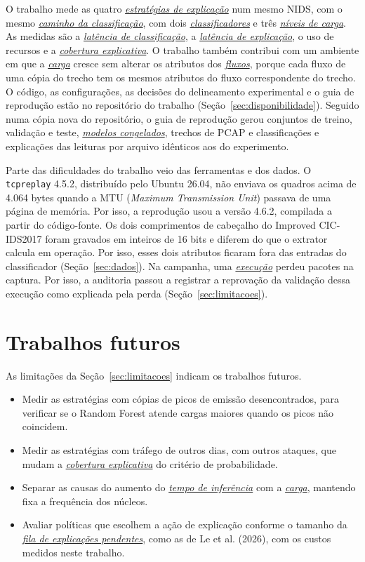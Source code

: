 \documentclass[
  12pt,
  oneside,
  a4paper,
  chapter=TITLE,
  sumario=tradicional,
  english,
  brazil
]{abntex2}
\newcommand{\termo}[2]{\hyperref[gl:#1]{\emph{#2}}}
\begin{document}
O trabalho mede as quatro \termo{estrategia}{estratégias de explicação} num mesmo NIDS, com o mesmo
\termo{caminho}{caminho da classificação}, com dois \termo{classificador}{classificadores} e três
\termo{nivel-carga}{níveis de carga}. As medidas são a
\termo{latencia-classificacao}{latência de classificação}, a
\termo{latencia-explicacao}{latência de explicação}, o uso de recursos e a
\termo{cobertura-explicativa}{cobertura explicativa}. O trabalho também contribui com um ambiente em
que a \termo{carga}{carga} cresce sem alterar os atributos dos \termo{fluxo}{fluxos}, porque cada
fluxo de uma cópia do trecho tem os mesmos atributos do fluxo correspondente do trecho. O código, as
configurações, as decisões do delineamento experimental e o guia de reprodução estão no repositório
do trabalho (Seção~\ref{sec:disponibilidade}).
Seguido numa cópia nova do repositório, o guia de reprodução gerou conjuntos de treino, validação e
teste, \termo{modelo-congelado}{modelos congelados}, trechos de PCAP e classificações e explicações
das leituras por arquivo idênticos aos do experimento.

Parte das dificuldades do trabalho veio das ferramentas e dos dados. O \texttt{tcpreplay} 4.5.2,
distribuído pelo Ubuntu 26.04, não enviava os quadros acima de 4.064 bytes quando a MTU (\emph{Maximum Transmission
Unit}) passava de uma página de memória. Por isso, a reprodução usou a versão 4.6.2, compilada a partir do
código-fonte. Os dois comprimentos de cabeçalho do Improved CIC-IDS2017 foram gravados em inteiros
de 16 bits e diferem do que o extrator calcula em operação. Por isso, esses dois atributos ficaram
fora das entradas do classificador (Seção~\ref{sec:dados}). Na campanha, uma
\termo{execucao}{execução} perdeu pacotes na captura. Por isso, a auditoria passou a registrar a
reprovação da validação dessa execução como explicada pela perda (Seção~\ref{sec:limitacoes}).

\section{Trabalhos futuros}

As limitações da Seção~\ref{sec:limitacoes} indicam os trabalhos futuros.
\begin{itemize}
  \item Medir as estratégias com cópias de picos de emissão desencontrados, para verificar se o
  Random Forest atende cargas maiores quando os picos não coincidem.
  \item Medir as estratégias com tráfego de outros dias, com outros ataques, que mudam a
  \termo{cobertura-explicativa}{cobertura explicativa} do critério de probabilidade.
  \item Separar as causas do aumento do \termo{tempo-inferencia}{tempo de inferência} com a
  \termo{carga}{carga}, mantendo fixa a frequência dos núcleos.
  \item Avaliar políticas que escolhem a ação de explicação conforme o tamanho da
  \termo{fila-explicacoes}{fila de explicações pendentes}, como as de Le et al. (2026), com os custos
  medidos neste trabalho.
\end{itemize}
\end{document}
